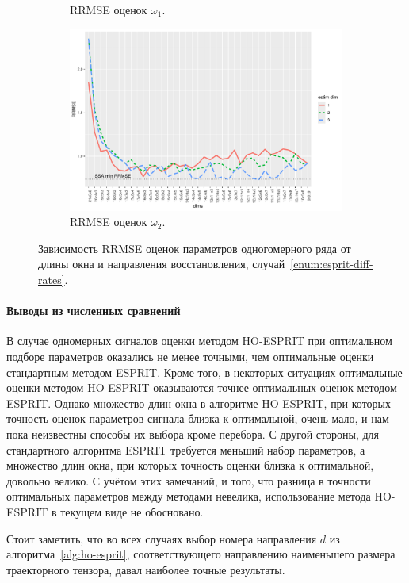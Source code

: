 \documentclass[specialist,
  substylefile=spbu.rtx,
subf,href,colorlinks=true, 12pt]{disser}
\theoremstyle{plain}
\theoremstyle{definition}
\theoremstyle{remark}
\begin{document}
\begin{figure}[!ht]
\begin{subfigure}{0.49\linewidth}
    \caption{RRMSE оценок $\omega_1$.}
    \label{fig:freq1_dims}
  \end{subfigure}
  \begin{subfigure}{0.49\linewidth}
    \includegraphics[width=\linewidth]{freq2_dims.pdf}
    \caption{RRMSE оценок $\omega_2$.}
    \label{fig:freq2_dims}
  \end{subfigure}
  \caption{Зависимость RRMSE оценок параметров одногомерного ряда
    от длины окна и направления восстановления,
  случай~\ref{enum:esprit-diff-rates}.}
  \label{fig:dims_diff_rates}
\end{figure}

\paragraph{Выводы из численных сравнений}
В случае одномерных сигналов оценки методом HO-ESPRIT при оптимальном подборе параметров
оказались не менее точными, чем оптимальные оценки стандартным методом ESPRIT.
Кроме того, в некоторых ситуациях оптимальные оценки методом HO-ESPRIT оказываются точнее
оптимальных оценок методом ESPRIT.
Однако множество длин окна в алгоритме HO-ESPRIT, при которых точность оценок параметров сигнала
близка к оптимальной, очень мало, и нам пока неизвестны способы их выбора кроме перебора.
С другой стороны, для стандартного алгоритма ESPRIT требуется меньший набор параметров,
а множество длин окна, при которых точность оценки близка к оптимальной, довольно велико.
С учётом этих замечаний, и того, что разница в точности оптимальных
параметров между методами невелика, использование метода HO-ESPRIT в текущем виде
не обосновано.

Стоит заметить, что во всех случаях выбор номера направления $d$ из
алгоритма~\ref{alg:ho-esprit}, соответствующего направлению наименьшего размера
траекторного тензора, давал наиболее точные результаты.
\end{document}
